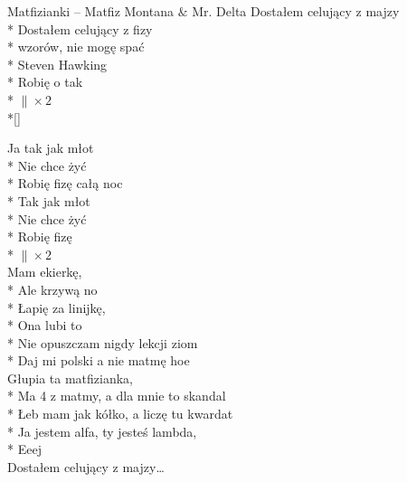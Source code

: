 \begin{piosenka_dluga}{Matfizianki -- Matfiz Montana $\&$ Mr. Delta}
 Dostałem celujący z majzy \\*
 Dostałem celujący z fizy \\*
 wzorów, nie mogę spać \\*
 Steven Hawking \\*
 Robię o tak \\*
 $\| \times 2$ \\*[\zwrotkaspace]

 Ja tak jak młot \\*
 Nie chce żyć \\*
 Robię fizę całą noc \\*
 Tak jak młot \\*
 Nie chce żyć \\*
 Robię fizę \\*
 $\| \times 2$ \\[\zwrotkaspace]

Mam ekierkę, \\*
Ale krzywą no \\*
Łapię za linijkę, \\*
Ona lubi to \\*
Nie opuszczam nigdy lekcji ziom \\*
Daj mi polski a nie matmę hoe \\[\zwrotkaspace]

Głupia ta matfizianka, \\*
Ma 4 z matmy, a dla mnie to skandal \\*
Łeb mam jak kółko, a liczę tu kwardat \\*
Ja jestem alfa, ty jesteś lambda, \\*
Eeej \\[\zwrotkaspace]

 Dostałem celujący z majzy\ldots \\[\zwrotkaspace]

\end{piosenka_dluga}